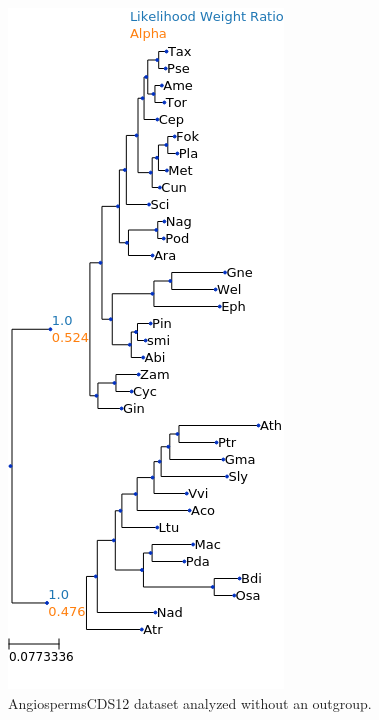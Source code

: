 \documentclass{article}
\begin{document}
\begin{figure}
  \begin{center}
    \includegraphics[width=.5\linewidth]{figs/angio/cds12_no_outgroup_lwr.png}
    \caption{AngiospermsCDS12 dataset analyzed without an outgroup.}
    \label{fig:angio-cds12-no-outgroup}
  \end{center}
\end{figure}
\end{document}
